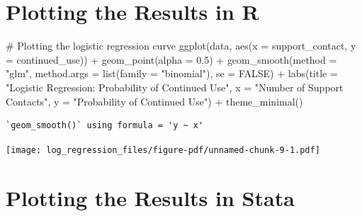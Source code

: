 \documentclass[
  letterpaper,
  DIV=11,
  numbers=noendperiod]{scrreprt}
\newenvironment{Shaded}{\begin{snugshade}}{\end{snugshade}}
\newcommand{\AttributeTok}[1]{\textcolor[rgb]{0.40,0.45,0.13}{#1}}
\newcommand{\CommentTok}[1]{\textcolor[rgb]{0.37,0.37,0.37}{#1}}
\newcommand{\ConstantTok}[1]{\textcolor[rgb]{0.56,0.35,0.01}{#1}}
\newcommand{\FloatTok}[1]{\textcolor[rgb]{0.68,0.00,0.00}{#1}}
\newcommand{\FunctionTok}[1]{\textcolor[rgb]{0.28,0.35,0.67}{#1}}
\newcommand{\NormalTok}[1]{\textcolor[rgb]{0.00,0.23,0.31}{#1}}
\newcommand{\SpecialCharTok}[1]{\textcolor[rgb]{0.37,0.37,0.37}{#1}}
\newcommand{\StringTok}[1]{\textcolor[rgb]{0.13,0.47,0.30}{#1}}
\begin{document}
\section{Plotting the Results in R}\label{plotting-the-results-in-r-1}

\begin{Shaded}
\begin{Highlighting}[]
\CommentTok{\# Plotting the logistic regression curve}
\FunctionTok{ggplot}\NormalTok{(data, }\FunctionTok{aes}\NormalTok{(}\AttributeTok{x =}\NormalTok{ support\_contact, }\AttributeTok{y =}\NormalTok{ continued\_use)) }\SpecialCharTok{+}
  \FunctionTok{geom\_point}\NormalTok{(}\AttributeTok{alpha =} \FloatTok{0.5}\NormalTok{) }\SpecialCharTok{+}
  \FunctionTok{geom\_smooth}\NormalTok{(}\AttributeTok{method =} \StringTok{"glm"}\NormalTok{, }\AttributeTok{method.args =} \FunctionTok{list}\NormalTok{(}\AttributeTok{family =} \StringTok{"binomial"}\NormalTok{), }\AttributeTok{se =} \ConstantTok{FALSE}\NormalTok{) }\SpecialCharTok{+}
  \FunctionTok{labs}\NormalTok{(}\AttributeTok{title =} \StringTok{"Logistic Regression: Probability of Continued Use"}\NormalTok{,}
       \AttributeTok{x =} \StringTok{"Number of Support Contacts"}\NormalTok{,}
       \AttributeTok{y =} \StringTok{"Probability of Continued Use"}\NormalTok{) }\SpecialCharTok{+}
  \FunctionTok{theme\_minimal}\NormalTok{()}
\end{Highlighting}
\end{Shaded}

\begin{verbatim}
`geom_smooth()` using formula = 'y ~ x'
\end{verbatim}

\texttt{[image: log\_regression\_files/figure-pdf/unnamed-chunk-9-1.pdf]}

\section{Plotting the Results in
Stata}\label{plotting-the-results-in-stata-1}
\end{document}
